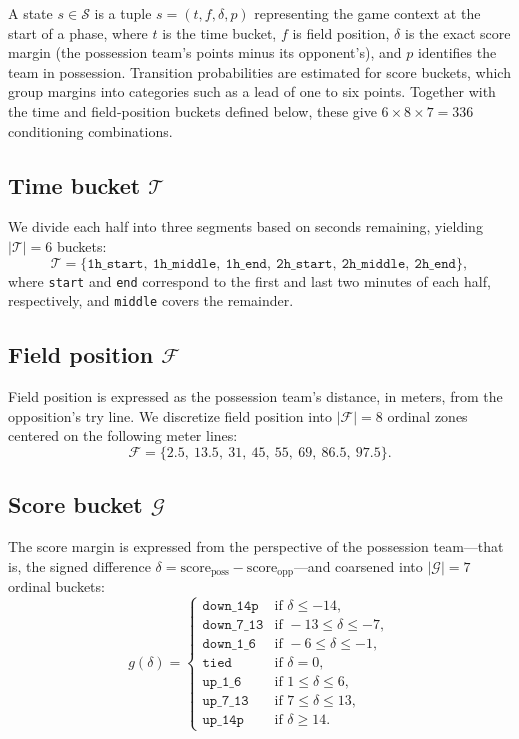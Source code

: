 \documentclass[12pt]{article}
\begin{document}
A state $s \in \mathcal{S}$ is a tuple $s=(t,f,\delta,p)$ representing the game context at the start of a phase, where $t$ is the time bucket, $f$ is field position, $\delta$ is the exact score margin (the possession team's points minus its opponent's), and $p$ identifies the team in possession.
Transition probabilities are estimated for score buckets, which group margins into categories such as a lead of one to six points.
Together with the time and field-position buckets defined below, these give $6\times8\times7=336$ conditioning combinations.

\subsection*{Time bucket $\mathcal{T}$}
We divide each half into three segments based on seconds remaining, yielding $|\mathcal{T}| = 6$ buckets:
\[
  \mathcal{T} = \{\texttt{1h\_start},\ \texttt{1h\_middle},\ \texttt{1h\_end},\ \texttt{2h\_start},\ \texttt{2h\_middle},\ \texttt{2h\_end}\},
\]
where \texttt{start} and \texttt{end} correspond to the first and last two minutes of each half, respectively, and \texttt{middle} covers the remainder.

\subsection*{Field position $\mathcal{F}$}
Field position is expressed as the possession team's distance, in meters, from the opposition's try line. We discretize field position into $|\mathcal{F}| = 8$ ordinal zones centered on the following meter lines:
\[
  \mathcal{F} = \{2.5,\ 13.5,\ 31,\ 45,\ 55,\ 69,\ 86.5,\ 97.5\}.
\]

\subsection*{Score bucket $\mathcal{G}$}
The score margin is expressed from the perspective of the possession team---that is, the signed difference $\delta = \text{score}_{\text{poss}} - \text{score}_{\text{opp}}$---and coarsened into $|\mathcal{G}| = 7$ ordinal buckets:
\[
  g(\delta) =
  \begin{cases}
    \texttt{down\_14p}  & \text{if } \delta \leq -14, \\
    \texttt{down\_7\_13} & \text{if } -13 \leq \delta \leq -7, \\
    \texttt{down\_1\_6}  & \text{if } -6 \leq \delta \leq -1, \\
    \texttt{tied}        & \text{if } \delta = 0, \\
    \texttt{up\_1\_6}    & \text{if } 1 \leq \delta \leq 6, \\
    \texttt{up\_7\_13}   & \text{if } 7 \leq \delta \leq 13, \\
    \texttt{up\_14p}     & \text{if } \delta \geq 14.
  \end{cases}
\]
\end{document}
